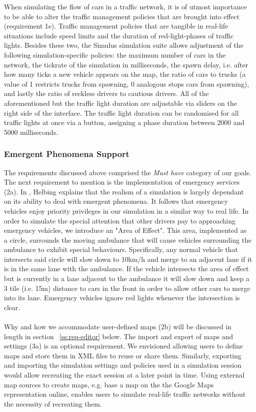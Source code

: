 When simulating the flow of cars in a traffic network, it is of utmost importance to be able to alter the traffic management policies that are brought into effect (requirement 1e). Traffic management policies that are tangible in real-life situations include speed limits and the duration of red-light-phases of traffic lights. Besides these two, the Simulus simulation suite allows adjustment of the following simulation-specific policies: the maximum number of cars in the network, the tickrate of the simulation in milliseconds, the spawn delay, i.e. after how many ticks a new vehicle appears on the map, the ratio of cars to trucks (a value of 1 restricts trucks from spawning, 0 analogous stops cars from spawning), and lastly the ratio of reckless drivers to cautious drivers. All of the aforementioned but the traffic light duration are adjustable via sliders on the right side of the interface. The traffic light duration can be randomised for all traffic lights at once via a button, assigning a phase duration between 2000 and 5000 milliseconds.

\subsubsection*{Emergent Phenomena Support}

The requirements discussed above comprised the \textit{Must have} category of our goals. The next requirement to mention is the implementation of emergency services (2a). In \cite{helbing2013agent}, Helbing explains that the realism of a simulation is largely dependant on its ability to deal with emergent phenomena. It follows that emergency vehicles enjoy priority privileges in our simulation in a similar way to real life. In order to simulate the special attention that other drivers pay to approaching emergency vehicles, we introduce an "Area of Effect". This area, implemented as a circle, surrounds the moving ambulance that will cause vehicles surrounding the ambulance to exhibit special behaviours. Specifically, any normal vehicle that intersects said circle will slow down to 10km/h and merge to an adjacent lane if it is in the same lane with the ambulance. If the vehicle intersects the area of effect but is currently in a lane adjacent to the ambulance it will slow down and keep a 3 tile (i.e. 15m) distance to cars in the front in order to allow other cars to merge into its lane. Emergency vehicles ignore red lights whenever the intersection is clear.
\\\\
Why and how we accommodate user-defined maps (2b) will be discussed in length in section ~\ref{ss:req-editor} below. The import and export of maps and settings (3a) is an optional requirement. We envisioned allowing users to define maps and store them in XML files to reuse or share them. Similarly, exporting and importing the simulation settings and policies used in a simulation session would allow recreating the exact session at a later point in time. Using external map sources to create maps, e.g. base a map on the the Google Maps representation online, enables users to simulate real-life traffic networks without the necessity of recreating them.

